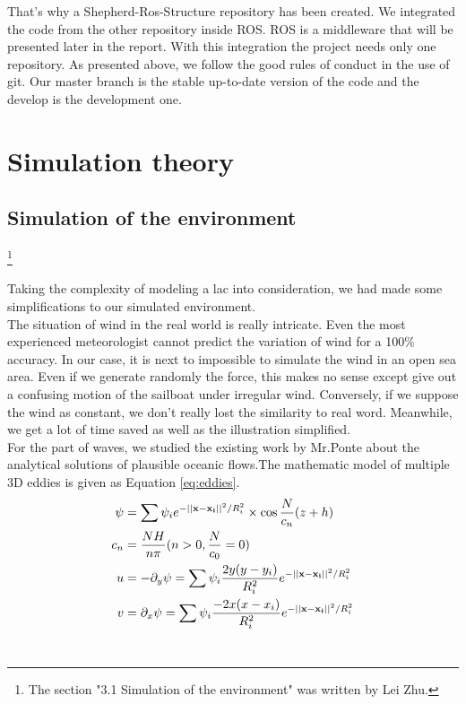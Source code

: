 \documentclass[a4paper]{report}
\begin{document}
That's why a Shepherd-Ros-Structure repository has been created. We integrated the code from the other repository inside ROS. ROS is a middleware that will be presented later in the report. With this integration the project needs only one repository. As presented above, we follow the good rules of conduct in the use of git. Our master branch is the stable up-to-date version of the code and the develop is the development one.

\chapter{Simulation theory} \label{section:simulation}
\section{Simulation of the environment}

\footnote{The section "3.1 Simulation of the environment" was written by Lei Zhu.}

Taking the complexity of modeling a lac into consideration, we had made some simplifications to our simulated environment. \\

The situation of wind in the real world is really intricate. Even the most experienced meteorologist cannot predict the variation of wind for a 100\% accuracy. In our case, it is next to impossible to simulate the wind in an open sea area. Even if we generate randomly the force, this makes no sense except give out a confusing motion of the sailboat under irregular wind. Conversely, if we suppose the wind as constant, we don't really lost the similarity to real word. Meanwhile, we get a lot of time saved as well as the illustration simplified.\\

For the part of waves, we studied the existing work by Mr.Ponte about the analytical solutions of plausible oceanic flows.The mathematic model of multiple 3D eddies is given as Equation \ref{eq:eddies}. \\
\begin{equation}
\begin{aligned}
\psi&= \sum \psi_i e^{-||\mathbf{x-x_i}||^2/R_i^2} \times \cos \frac{N}{c_n}(z+h)  \\
c_n &=\frac{NH}{n\pi} \space ( n>0 \space  , \space \frac{N}{c_0}=0 )  \\
u &=-\partial_y \psi = \sum \psi_i \frac{2y(y-y_i)}{R_i^2} e^{-||\mathbf{x-x_i}||^2/R_i^2}   \\
v &=\partial_x \psi = \sum \psi_i \frac{-2x(x-x_i)}{R_i^2} e^{-||\mathbf{x-x_i}||^2/R_i^2} 
\label{eq:eddies}
\end{aligned}
\end{equation}\\
\end{document}
